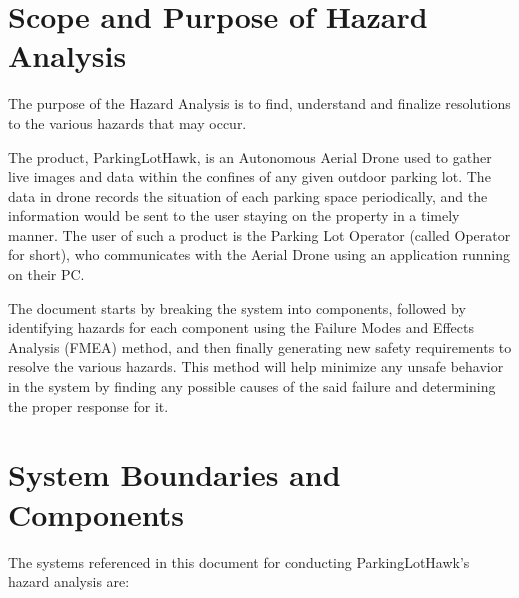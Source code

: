 \documentclass{article}
\begin{document}
\section{Scope and Purpose of Hazard Analysis}

The purpose of the Hazard Analysis is to find, understand and finalize resolutions to the various hazards that may occur.

The product, ParkingLotHawk, is an Autonomous Aerial Drone used to gather live images and data within the confines of any given outdoor parking lot. The data in drone records the situation of each parking space periodically, and the information would be sent to the user staying on the property in a timely manner. The user of such a product is the Parking Lot Operator (called Operator for short), who communicates with the Aerial Drone using an application running on their PC.

The document starts by breaking the system into components, followed by identifying hazards for each component using the Failure Modes and Effects Analysis (FMEA) method, and then finally generating new safety requirements to resolve the various hazards. This method will help minimize any unsafe behavior in the system by finding any possible causes of the said failure and determining the proper response for it.

\section{System Boundaries and Components}
The systems referenced in this document for conducting ParkingLotHawk’s hazard analysis are:
\end{document}
